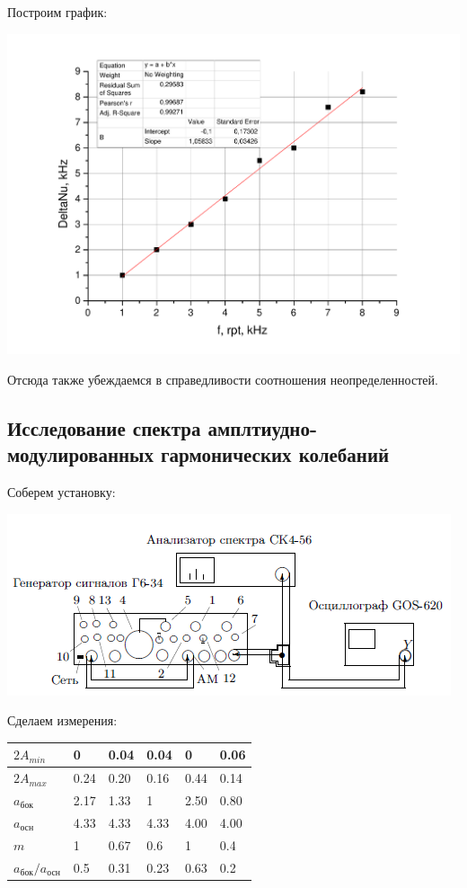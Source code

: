 \documentclass[a4paper,12pt]{article}
\begin{document}
		Построим график:
		
		\includegraphics[width = 0.7\linewidth]{graphB}
		
		Отсюда также убеждаемся в справедливости соотношения неопределенностей.
		
		\subsection{Исследование спектра амплтиудно-модулированных гармонических колебаний}
		
		Соберем установку:
		
		\includegraphics[width = 0.7\linewidth]{scheme3}
		
		Сделаем измерения:
		
		\begin{table}[h]
			\begin{tabular}{|l|l|l|l|l|l|}
				\hline
				$2A_{min}$                           & 0    & 0.04 & 0.04 & 0    & 0.06 \\ \hline
				$2A_{max}$                           & 0.24 & 0.20 & 0.16 & 0.44 & 0.14 \\ \hline
				$a_\text{бок}$                     & 2.17 & 1.33 & 1    & 2.50 & 0.80 \\ \hline
				$a_\text{осн}$                     & 4.33 & 4.33 & 4.33 & 4.00 & 4.00 \\ \hline
				$m$                                  & 1    & 0.67 & 0.6  & 1    & 0.4  \\ \hline
				$a_\text{бок}/a_\text{осн}$ & 0.5  & 0.31 & 0.23 & 0.63 & 0.2  \\ \hline
			\end{tabular}
		\end{table}
		
\end{document}
